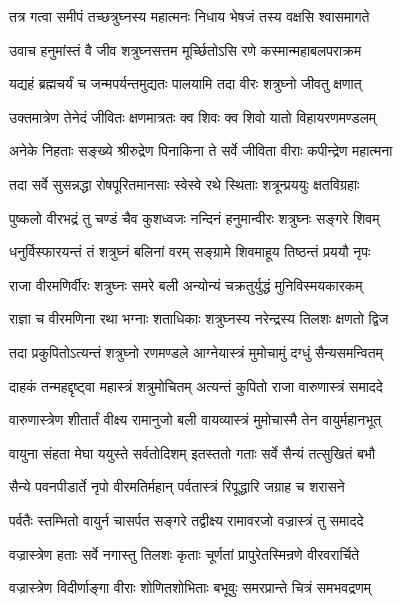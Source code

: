 \twolineshloka
{तत्र गत्वा समीपं तच्छत्रुघ्नस्य महात्मनः}
{निधाय भेषजं तस्य वक्षसि श्वासमागते}%

\twolineshloka
{उवाच हनुमांस्तं वै जीव शत्रुघ्नसत्तम}
{मूर्च्छितोऽसि रणे कस्मान्महाबलपराक्रम}%

\twolineshloka
{यद्यहं ब्रह्मचर्यं च जन्मपर्यन्तमुद्यतः}
{पालयामि तदा वीरः शत्रुघ्नो जीवतु क्षणात्}%

\twolineshloka
{उक्तमात्रेण तेनेदं जीवितः क्षणमात्रतः}
{क्व शिवः क्व शिवो यातो विहायरणमण्डलम्}%

\twolineshloka
{अनेके निहताः सङ्ख्ये श्रीरुद्रेण पिनाकिना}
{ते सर्वे जीविता वीराः कपीन्द्रेण महात्मना}%

\twolineshloka
{तदा सर्वे सुसन्नद्धा रोषपूरितमानसाः}
{स्वेस्वे रथे स्थिताः शत्रून्प्रययुः क्षतविग्रहाः}%

\twolineshloka
{पुष्कलो वीरभद्रं तु चण्डं चैव कुशध्वजः}
{नन्दिनं हनुमान्वीरः शत्रुघ्नः सङ्गरे शिवम्}%

\twolineshloka
{धनुर्विस्फारयन्तं तं शत्रुघ्नं बलिनां वरम्}
{सङ्ग्रामे शिवमाहूय तिष्ठन्तं प्रययौ नृपः}%

\twolineshloka
{राजा वीरमणिर्वीरः शत्रुघ्नः समरे बली}
{अन्योन्यं चक्रतुर्युद्धं मुनिविस्मयकारकम्}%

\twolineshloka
{राज्ञा च वीरमणिना रथा भग्नाः शताधिकाः}
{शत्रुघ्नस्य नरेन्द्रस्य तिलशः क्षणतो द्विज}%

\twolineshloka
{तदा प्रकुपितोऽत्यन्तं शत्रुघ्नो रणमण्डले}
{आग्नेयास्त्रं मुमोचामुं दग्धुं सैन्यसमन्वितम्}%

\twolineshloka
{दाहकं तन्महद्दृष्ट्वा महास्त्रं शत्रुमोचितम्}
{अत्यन्तं कुपितो राजा वारुणास्त्रं समाददे}%

\twolineshloka
{वारुणास्त्रेण शीतार्तं वीक्ष्य रामानुजो बली}
{वायव्यास्त्रं मुमोचास्मै तेन वायुर्महानभूत्}%

\twolineshloka
{वायुना संहता मेघा ययुस्ते सर्वतोदिशम्}
{इतस्ततो गताः सर्वे सैन्यं तत्सुखितं बभौ}%

\twolineshloka
{सैन्ये पवनपीडार्ते नृपो वीरमतिर्महान्}
{पर्वतास्त्रं रिपूद्धारि जग्राह च शरासने}%

\twolineshloka
{पर्वतैः स्तम्भितो वायुर्न चासर्पत सङ्गरे}
{तद्वीक्ष्य रामावरजो वज्रास्त्रं तु समाददे}%

\twolineshloka
{वज्रास्त्रेण हताः सर्वे नगास्तु तिलशः कृताः}
{चूर्णतां प्रापुरेतस्मिन्रणे वीरवरार्चिते}%

\twolineshloka
{वज्रास्त्रेण विदीर्णाङ्गा वीराः शोणितशोभिताः}
{बभूवुः समरप्रान्ते चित्रं समभवद्रणम्}%

